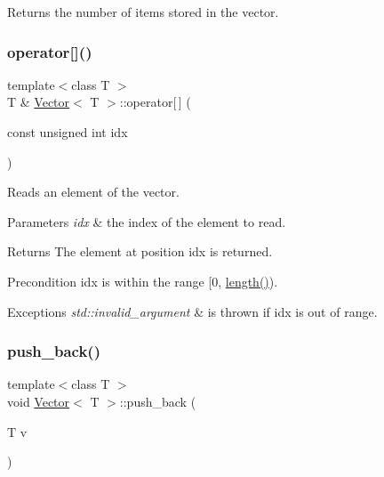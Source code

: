 \begin{DoxyReturn}{Returns}
the number of items stored in the vector. 
\end{DoxyReturn}
\mbox{\label{classVector_a6cf5a211415fd74a49d37c7ffe8f7d78}} 
\subsubsection{\texorpdfstring{operator[]()}{operator[]()}}
{\footnotesize\ttfamily template$<$class T $>$ \\
T \& \hyperlink{classVector}{Vector}$<$ T $>$\+::operator\mbox{[}$\,$\mbox{]} (\begin{DoxyParamCaption}\item[{const unsigned int}]{idx }\end{DoxyParamCaption})}



Reads an element of the vector. 


\begin{DoxyParams}{Parameters}
{\em idx} & the index of the element to read. \\
\hline
\end{DoxyParams}
\begin{DoxyReturn}{Returns}
The element at position idx is returned.
\end{DoxyReturn}
\begin{DoxyPrecond}{Precondition}
idx is within the range \mbox{[}0, \hyperlink{classVector_af15b2f88e9cc1f54cdb2759db37c13c2}{length()}). 
\end{DoxyPrecond}

\begin{DoxyExceptions}{Exceptions}
{\em std\+::invalid\+\_\+argument} & is thrown if idx is out of range. \\
\hline
\end{DoxyExceptions}
\mbox{\label{classVector_a31c38ed12e608a4e950391c7f3dfc114}} 
\subsubsection{\texorpdfstring{push\+\_\+back()}{push\_back()}}
{\footnotesize\ttfamily template$<$class T $>$ \\
void \hyperlink{classVector}{Vector}$<$ T $>$\+::push\+\_\+back (\begin{DoxyParamCaption}\item[{T}]{v }\end{DoxyParamCaption})}



